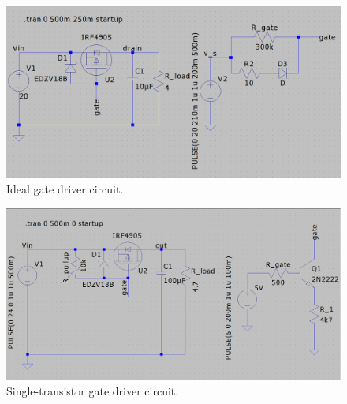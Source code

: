 \documentclass[main.tex]{subfiles}
\begin{document}
    \begin{figure}[!h]
        \centerline{\includegraphics[width=\linewidth]{media/ideal_gate_drive.png}}
        \caption{Ideal gate driver circuit.}
        \label{fig:ideal_gate_drive}
    \end{figure}

    \begin{figure}[!h]
        \centerline{\includegraphics[width=\linewidth]{media/pmos_switch_npn.png}}
        \caption{Single-transistor gate driver circuit.} 
        \label{fig:single_transistor_gate_drive}
    \end{figure}
\end{document}

